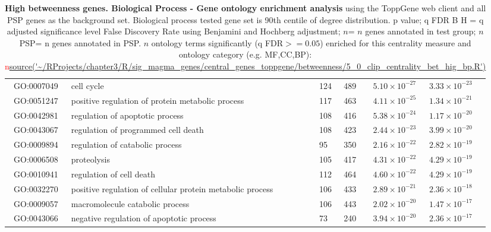 \begin{table}[ht]
\begin{adjustbox}{width=\textwidth}
\begin{tabular}{@{}clllcl@{}}
  \midrule
GO:0007049 & cell cycle & 124 & 489 & $5.10 \times 10^{-27}$ & $3.33 \times 10^{-23}$ \\ 
  GO:0051247 & positive regulation of protein metabolic process & 117 & 463 & $4.11 \times 10^{-25}$ & $1.34 \times 10^{-21}$ \\ 
  GO:0042981 & regulation of apoptotic process & 108 & 416 & $5.38 \times 10^{-24}$ & $1.17 \times 10^{-20}$ \\ 
  GO:0043067 & regulation of programmed cell death & 108 & 423 & $2.44 \times 10^{-23}$ & $3.99 \times 10^{-20}$ \\ 
  GO:0009894 & regulation of catabolic process & 95 & 350 & $2.16 \times 10^{-22}$ & $2.82 \times 10^{-19}$ \\ 
  GO:0006508 & proteolysis & 105 & 417 & $4.31 \times 10^{-22}$ & $4.29 \times 10^{-19}$ \\ 
  GO:0010941 & regulation of cell death & 112 & 464 & $4.60 \times 10^{-22}$ & $4.29 \times 10^{-19}$ \\ 
  GO:0032270 & positive regulation of cellular protein metabolic process & 106 & 433 & $2.89 \times 10^{-21}$ & $2.36 \times 10^{-18}$ \\ 
  GO:0009057 & macromolecule catabolic process & 106 & 443 & $2.02 \times 10^{-20}$ & $1.47 \times 10^{-17}$ \\ 
  GO:0043066 & negative regulation of apoptotic process & 73 & 240 & $3.94 \times 10^{-20}$ & $2.36 \times 10^{-17}$ \\ 
   \bottomrule
\end{tabular}
\end{adjustbox}
\caption[Gene ontology enrichment High betweenness genes Biological Process of genes above 90th centile of distribution]{\textbf{High betweenness genes. Biological Process - Gene ontology enrichment analysis} using the ToppGene web client and all PSP genes as the background set.  Biological process tested gene set is 90th centile of degree distribution.  p value; q FDR B H = q adjusted significance level False Discovery Rate using Benjamini and Hochberg adjustment; $n$= $n$ genes annotated in test group; $n$ PSP= n genes annotated in PSP. $n$ ontology terms significantly (q FDR$>=0.05$) enriched for this centrality measure and ontology category (e.g. MF,CC,BP): \textcolor{red}{n}\url{source('~/RProjects/chapter3/R/sig_magma_genes/central_genes_toppgene/betweenness/5_0_clip_centrality_bet_hig_bp.R')}} 
\label{tab:ToppGENE GO: Biological Process. bet 90 centile cwpsp.txtp = p value; q FDR B H = q adjusted significance level False Discovery Rate using Benjamini and Hochberg adjustment; n= n genes annotated in test group; n PSP= n genes annotated in PSP}
\end{table}

